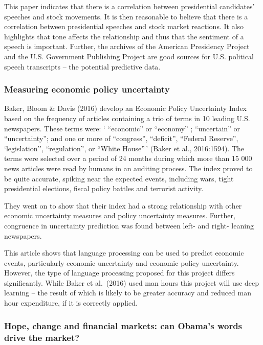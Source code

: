 \documentclass[11pt,preprint, authoryear]{elsarticle}
\numberwithin{equation}{section}
\numberwithin{figure}{section}
\numberwithin{table}{section}
\begin{document}
This paper indicates that there is a correlation between presidential
candidates' speeches and stock movements. It is then reasonable to
believe that there is a correlation between presidential speeches and
stock market reactions. It also highlights that tone affects the
relationship and thus that the sentiment of a speech is important.
Further, the archives of the American Presidency Project and the U.S.
Government Publishing Project are good sources for U.S. political speech
transcripts -- the potential predictive data.

\hypertarget{measuring-economic-policy-uncertainty}{%
\subsubsection{Measuring economic policy
uncertainty}\label{measuring-economic-policy-uncertainty}}

Baker, Bloom \& Davis (2016) develop an Economic Policy Uncertainty
Index based on the frequency of articles containing a trio of terms in
10 leading U.S. newspapers. These terms were: ` ``economic'' or
``economy'' ; ``uncertain'' or ``uncertainty''; and one or more of
``congress'', ``deficit'', ``Federal Reserve'', `legislation'',
``regulation'', or ``White House''\,' (Baker et al., 2016:1594). The
terms were selected over a period of 24 months during which more than 15
000 news articles were read by humans in an auditing process. The index
proved to be quite accurate, spiking near the expected events, including
wars, tight presidential elections, fiscal policy battles and terrorist
activity.

They went on to show that their index had a strong relationship with
other economic uncertainty measures and policy uncertainty measures.
Further, congruence in uncertainty prediction was found between left-
and right- leaning newspapers.

This article shows that language processing can be used to predict
economic events, particularly economic uncertainty and economic policy
uncertainty. However, the type of language processing proposed for this
project differs significantly. While Baker et al.~(2016) used man hours
this project will use deep learning -- the result of which is likely to
be greater accuracy and reduced man hour expenditure, if it is correctly
applied.

\hypertarget{hope-change-and-financial-markets-can-obamas-words-drive-the-market}{%
\subsubsection{Hope, change and financial markets: can Obama's words
drive the
market?}\label{hope-change-and-financial-markets-can-obamas-words-drive-the-market}}
\end{document}
